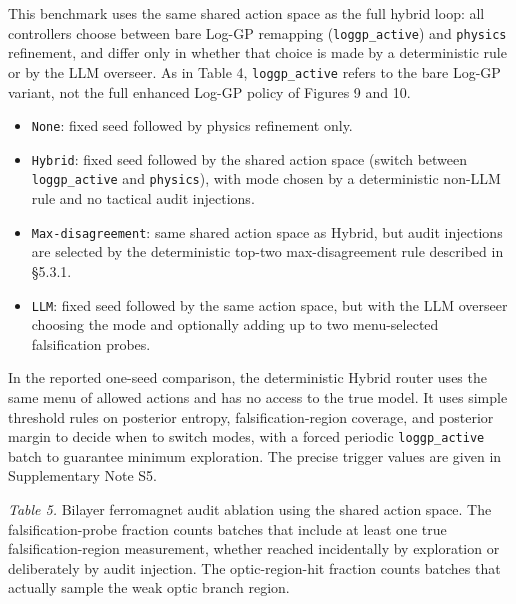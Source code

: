 \documentclass[
]{article}
\providecommand{\tightlist}{%
  \setlength{\itemsep}{0pt}\setlength{\parskip}{0pt}}
\begin{document}
This benchmark uses the same shared action space as the full hybrid
loop: all controllers choose between bare Log-GP remapping
(\texttt{loggp\_active}) and \texttt{physics} refinement, and differ
only in whether that choice is made by a deterministic rule or by the
LLM overseer. As in Table 4, \texttt{loggp\_active} refers to the bare
Log-GP variant, not the full enhanced Log-GP policy of Figures 9 and 10.

\begin{itemize}
\tightlist
\item
  \texttt{None}: fixed seed followed by physics refinement only.
\item
  \texttt{Hybrid}: fixed seed followed by the shared action space
  (switch between \texttt{loggp\_active} and \texttt{physics}), with
  mode chosen by a deterministic non-LLM rule and no tactical audit
  injections.
\item
  \texttt{Max-disagreement}: same shared action space as Hybrid, but
  audit injections are selected by the deterministic top-two
  max-disagreement rule described in §5.3.1.
\item
  \texttt{LLM}: fixed seed followed by the same action space, but with
  the LLM overseer choosing the mode and optionally adding up to two
  menu-selected falsification probes.
\end{itemize}

In the reported one-seed comparison, the deterministic Hybrid router
uses the same menu of allowed actions and has no access to the true
model. It uses simple threshold rules on posterior entropy,
falsification-region coverage, and posterior margin to decide when to
switch modes, with a forced periodic \texttt{loggp\_active} batch to
guarantee minimum exploration. The precise trigger values are given in
Supplementary Note S5.

\emph{Table 5.} Bilayer ferromagnet audit ablation using the shared
action space. The falsification-probe fraction counts batches that
include at least one true falsification-region measurement, whether
reached incidentally by exploration or deliberately by audit injection.
The optic-region-hit fraction counts batches that actually sample the
weak optic branch region.
\end{document}

